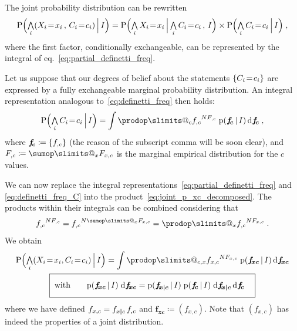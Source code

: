 \documentclass[\ifafour a4paper,12pt,\else a5paper,10pt,\fi%
onecolumn,oneside,article,%
british%
]{memoir}
\makeatletter
\theoremstyle{remark}
\theoremstyle{innote}
\def\sum{\DOTSI\sumop\slimits@}
\def\prod{\DOTSI\prodop\slimits@}
\newcommand*{\di}{\mathrm{d}}%
\newcommand*{\defd}{\coloneqq}
\newcommand*{\Land}{\mathop{\textstyle\bigwedge}}
\DeclarePairedDelimiter\set{\{}{\}}
\newcommand*{\pf}{\mathrm{p}}%
\newcommand*{\p}{\mathrm{P}}%
\renewcommand*{\|}[1][]{\nonscript\,#1\vert\nonscript\,\mathopen{}}
\newcommand*{\eqn}{eq.}%
\renewcommand*{\=}{\TextOrMath\texteq\eq}
\newcommand*{\X}[1]{X_{#1}}
\newcommand*{\x}[1]{x_{#1}}
\newcommand*{\C}[1]{C_{#1}}
\newcommand*{\cc}[1]{c_{#1}}
\newcommand*{\fxc}{\bm{f_{\!x\bcond c}}}
\newcommand*{\fc}{\bm{f_{\!c}}}
\newcommand*{\fj}{\bm{f_{\!xc}}}
\newcommand*{\bcond}[1][]{\nonscript\,#1\bm{\vert}\nonscript\;\mathopen{}}
\makeatother
\begin{document}
The joint probability distribution can be rewritten
\begin{equation}
  \label{eq:joint_p_xc_decomposed}
  \p\Bigl(\Land_{i} (\X{i}\=\x{i}\,,\, \C{i}\=\cc{i}) \|[\Big] I\Bigr) =%
  \p\Bigl(\Land_{i} \X{i}\=\x{i} \|[\Big] \Land_{i} \C{i}\=\cc{i}
  \,,\, I\Bigr) \times
  \p\Bigl(\Land_{i} \C{i}\=\cc{i} \|[\Big] I\Bigr)
  \;,
\end{equation}
where the first factor, conditionally exchangeable, can be represented by
the integral of \eqn~\eqref{eq:partial_definetti_freq}.

Let us suppose that our degrees of belief about the statements
$\set{\C{i}\=\cc{i}}$ are expressed by a fully exchangeable marginal
probability distribution. An integral representation analogous
to~\eqref{eq:definetti_freq} then holds:
\begin{equation}
  \label{eq:definetti_freq_C}
  \p\Bigl( \Land_{i}\C{i}\=\cc{i} \|[\Big] I\Bigr) =
\int\prod_{c} {f_{,c}}^{N F_{,c}}\;   \pf(\fc \| I)\,\di\fc \;,
\end{equation}
where $\fc \defd \set{f_{,c}}$ (the reason of the subscript comma will be
soon clear), and $F_{,c} \defd \sum_{x} F_{x,c}$ is the marginal empirical
distribution for the $c$ values.

We can now replace the integral
representations~\eqref{eq:partial_definetti_freq} and
\eqref{eq:definetti_freq_C} into the
product~\eqref{eq:joint_p_xc_decomposed}. The products within their
integrals can be combined considering that
\begin{equation}
  \label{eq:develop_prodfc}
  {f_{,c}}^{N F_{,c}} = {f_{,c}}^{N \sum_{x}F_{x,c}} =
  \prod_{x} {f_{,c}}^{N F_{x,c}} \;.
\end{equation}
We obtain
\begin{subequations}
  \label{eq:result}
  \begin{gather}
    \label{eq:integral_predictive_joint}
     \p\Bigl(\Land_{i} (\X{i}\=\x{i}, \C{i}\=\cc{i}) \|[\Big] I\Bigr) =
\int\prod_{c,x} {f_{x,c}}^{N F_{x, c}}\;  \pf(\fj\|I)\,\di\fj
\\
  \label{eq:factorizable}
\boxed{\;\text{with}\qquad \vphantom{\int}\pf(\fj\|I)\;\di\fj =
\pf(\fxc \| I)  \;
\pf(\fc \| I) \;\di\fxc\,\di\fc \quad}
\end{gather}
\end{subequations}
where we have defined $f_{x,c} = f_{x \bcond c}\, f_{,c}$ and
$\fj \defd (f_{x,c})$. Note that $(f_{x,c})$ has indeed the properties of a
joint distribution.
\end{document}

